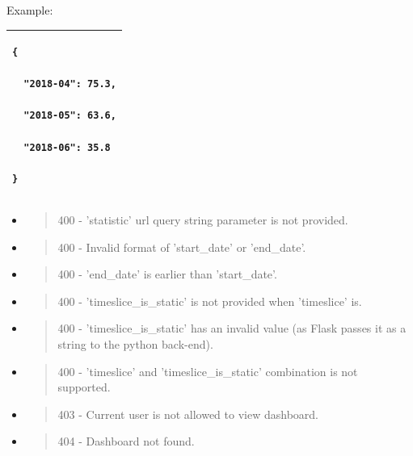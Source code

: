 Example:

\begin{longtable}[]{@{}l@{}}
\toprule
\endhead
\begin{minipage}[t]{0.97\columnwidth}\raggedright
\begin{lstlisting}
{

  "2018-04": 75.3,

  "2018-05": 63.6,

  "2018-06": 35.8

}
\end{lstlisting}\strut
\end{minipage}\tabularnewline
\bottomrule
\end{longtable}

\begin{itemize}
\item
  \begin{quote}
  400 - 'statistic' url query string parameter is not provided.
  \end{quote}
\item
  \begin{quote}
  400 - Invalid format of 'start\_date' or 'end\_date'.
  \end{quote}
\item
  \begin{quote}
  400 - 'end\_date' is earlier than 'start\_date'.
  \end{quote}
\item
  \begin{quote}
  400 - 'timeslice\_is\_static' is not provided when 'timeslice' is.
  \end{quote}
\item
  \begin{quote}
  400 - 'timeslice\_is\_static' has an invalid value (as Flask passes it
  as a string to the python back-end).
  \end{quote}
\item
  \begin{quote}
  400 - 'timeslice' and 'timeslice\_is\_static' combination is not
  supported.
  \end{quote}
\item
  \begin{quote}
  403 - Current user is not allowed to view dashboard.
  \end{quote}
\item
  \begin{quote}
  404 - Dashboard not found.
  \end{quote}
\end{itemize}

